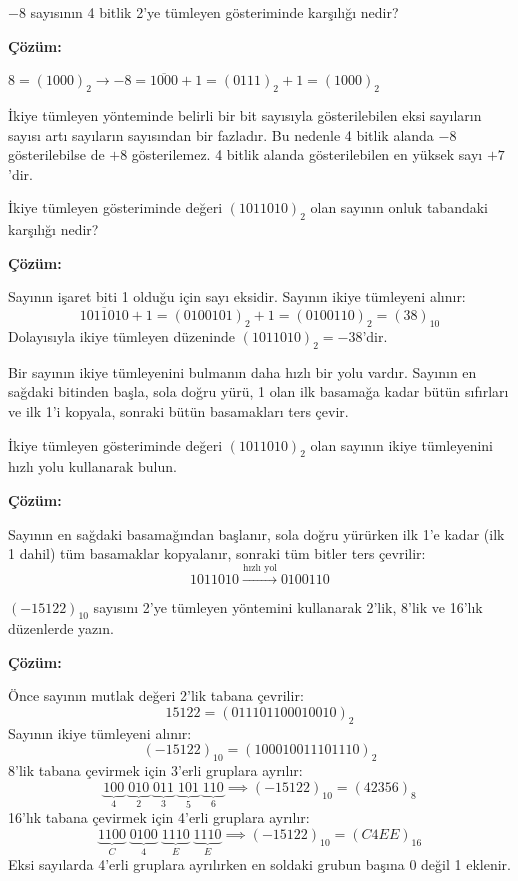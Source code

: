 \begin{ornek}[A.13]
$-8$ sayısının 4 bitlik 2'ye tümleyen gösteriminde karşılığı nedir?

\textbf{Çözüm:}

$8 = (1000)_2 \rightarrow -8 = \overline{1000} + 1 = (0111)_2 + 1 = (1000)_2$

İkiye tümleyen yönteminde belirli bir bit sayısıyla gösterilebilen eksi sayıların sayısı artı sayıların sayısından bir fazladır. Bu nedenle 4 bitlik alanda $-8$ gösterilebilse de $+8$ gösterilemez. 4 bitlik alanda gösterilebilen en yüksek sayı $+7$'dir.
\end{ornek}

\begin{ornek}[A.14]
İkiye tümleyen gösteriminde değeri $(1011010)_2$ olan sayının onluk tabandaki karşılığı nedir?

\textbf{Çözüm:}

Sayının işaret biti 1 olduğu için sayı eksidir. Sayının ikiye tümleyeni alınır:
\[
\overline{1011010} + 1 = (0100101)_2 + 1 = (0100110)_2 = (38)_{10}
\]
Dolayısıyla ikiye tümleyen düzeninde $(1011010)_2 = -38$'dir.
\end{ornek}

Bir sayının ikiye tümleyenini bulmanın daha hızlı bir yolu vardır. Sayının en sağdaki bitinden başla, sola doğru yürü, 1 olan ilk basamağa kadar bütün sıfırları ve ilk 1'i kopyala, sonraki bütün basamakları ters çevir.

\begin{ornek}[A.15]
İkiye tümleyen gösteriminde değeri $(1011010)_2$ olan sayının ikiye tümleyenini hızlı yolu kullanarak bulun.

\textbf{Çözüm:}

Sayının en sağdaki basamağından başlanır, sola doğru yürürken ilk 1'e kadar (ilk 1 dahil) tüm basamaklar kopyalanır, sonraki tüm bitler ters çevrilir:
\[
1011010 \xrightarrow{\text{hızlı yol}} 0100110
\]
\end{ornek}

\begin{ornek}[A.16]
$(-15122)_{10}$ sayısını 2'ye tümleyen yöntemini kullanarak 2'lik, 8'lik ve 16'lık düzenlerde yazın.

\textbf{Çözüm:}

Önce sayının mutlak değeri 2'lik tabana çevrilir:
\[
15122 = (011101100010010)_2
\]
Sayının ikiye tümleyeni alınır:
\[
(-15122)_{10} = (100010011101110)_2
\]
8'lik tabana çevirmek için 3'erli gruplara ayrılır:
\[
\underbrace{100}_{4}\;\underbrace{010}_{2}\;\underbrace{011}_{3}\;\underbrace{101}_{5}\;\underbrace{110}_{6} \implies (-15122)_{10} = (42356)_8
\]
16'lık tabana çevirmek için 4'erli gruplara ayrılır:
\[
\underbrace{1100}_{C}\;\underbrace{0100}_{4}\;\underbrace{1110}_{E}\;\underbrace{1110}_{E} \implies (-15122)_{10} = (C4EE)_{16}
\]
Eksi sayılarda 4'erli gruplara ayrılırken en soldaki grubun başına 0 değil 1 eklenir.
\end{ornek}


